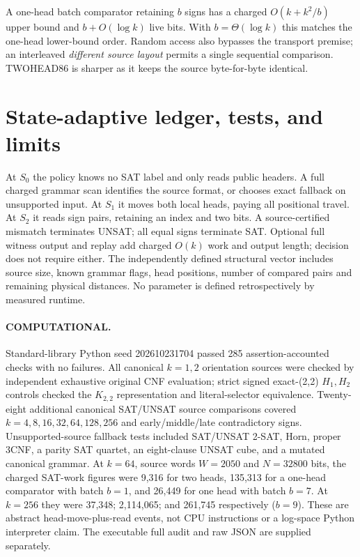\documentclass[11pt]{article}
\begin{document}
A one-head batch comparator retaining $b$ signs has a charged $O(k+k^2/b)$ upper bound and $b+O(\log k)$ live bits. With $b=\Theta(\log k)$ this matches the one-head lower-bound order. Random access also bypasses the transport premise; an interleaved \emph{different source layout} permits a single sequential comparison. TWOHEAD86 is sharper as it keeps the source byte-for-byte identical.

\section{State-adaptive ledger, tests, and limits}
At $S_0$ the policy knows no SAT label and only reads public headers. A full charged grammar scan identifies the source format, or chooses exact fallback on unsupported input. At $S_1$ it moves both local heads, paying all positional travel. At $S_2$ it reads sign pairs, retaining an index and two bits. A source-certified mismatch terminates UNSAT; all equal signs terminate SAT. Optional full witness output and replay add charged $O(k)$ work and output length; decision does not require either. The independently defined structural vector includes source size, known grammar flags, head positions, number of compared pairs and remaining physical distances. No parameter is defined retrospectively by measured runtime.

\paragraph{COMPUTATIONAL.} Standard-library Python seed 202610231704 passed 285 assertion-accounted checks with no failures. All canonical $k=1,2$ orientation sources were checked by independent exhaustive original CNF evaluation; strict signed exact-(2,2) $H_1,H_2$ controls checked the $K_{2,2}$ representation and literal-selector equivalence. Twenty-eight additional canonical SAT/UNSAT source comparisons covered $k=4,8,16,32,64,128,256$ and early/middle/late contradictory signs. Unsupported-source fallback tests included SAT/UNSAT 2-SAT, Horn, proper 3CNF, a parity SAT quartet, an eight-clause UNSAT cube, and a mutated canonical grammar. At $k=64$, source words $W=2050$ and $N=32800$ bits, the charged SAT-work figures were 9,316 for two heads, 135,313 for a one-head comparator with batch $b=1$, and 26,449 for one head with batch $b=7$. At $k=256$ they were 37,348; 2,114,065; and 261,745 respectively ($b=9$). These are abstract head-move-plus-read events, not CPU instructions or a log-space Python interpreter claim. The executable full audit and raw JSON are supplied separately.
\end{document}
